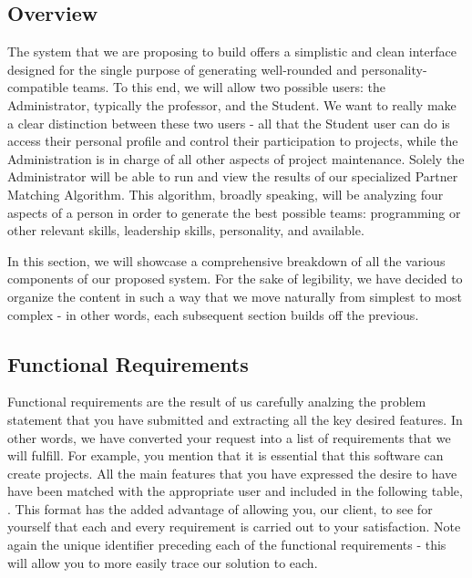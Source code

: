 \documentclass[12pt,letterpaper]{article}
\begin{document}
\subsection{Overview}

The system that we are proposing to build offers a simplistic and clean interface designed for the single purpose of generating 
well-rounded and personality-compatible teams. To this end, we will allow two possible users: the Administrator, typically the professor,
and the Student. We want to really make a clear distinction between these two users - all that the Student user can do is access their
personal profile and control their participation to projects, while the Administration is in charge of all other aspects of project maintenance. 
Solely the Administrator will be able to run and view the results of our specialized Partner Matching Algorithm. This algorithm, broadly speaking,
will be analyzing four aspects of a person in order to generate the best possible teams:  programming or other relevant skills, leadership skills,
personality, and available. 

In this section, we will showcase a comprehensive breakdown of all the various components of our proposed system. For the sake of 
legibility, we have decided to organize the content in such a way that we move naturally from simplest to most complex - in other words,
each subsequent section builds off the previous. 

\subsection{Functional Requirements}

Functional requirements are the result of us carefully analzing the problem statement that you have submitted and extracting all the key 
desired features. In other words, we have converted your request into a list of requirements that we will fulfill. For example, you mention that
it is essential that this software can create projects. All the main features that you have expressed the desire to have have been matched with
the appropriate user and included in the following table, . This format has the added advantage of allowing you, our client, to see for 
yourself that each and every requirement is carried out to your satisfaction. Note again the unique identifier preceding each of the functional 
requirements - this will allow you to more easily trace our solution to each. 
\end{document}
